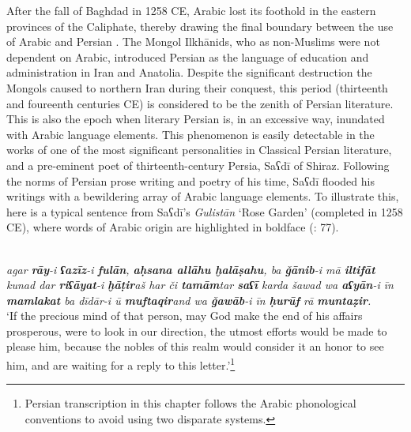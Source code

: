 \documentclass[output=paper]{langsci/langscibook}
\begin{document}
After the fall of Baghdad in 1258 CE, Arabic lost its foothold in the eastern provinces of the Caliphate, thereby drawing the final boundary between the use of Arabic and Persian \citep{Danner2000}. The Mongol Ilkhānids, who as non-Muslims were not dependent on Arabic, introduced Persian as the language of education and administration in Iran and Anatolia. Despite the significant destruction the Mongols caused to northern Iran during their conquest, this period (thirteenth and foureenth centuries CE) is considered to be the zenith of Persian literature. This is also the epoch when literary Persian is, in an excessive way, inundated with Arabic language elements. This phenomenon is easily detectable in the works of one of the most significant personalities in Classical Persian literature, and a pre-eminent poet of thirteenth-century Persia, Saʕdī of Shiraz. Following the norms of Persian prose writing and poetry of his time, Saʕdī flooded his writings with a bewildering array of Arabic language elements. To illustrate this, here is a typical sentence from Saʕdī’s \textit{Gulistān} ‘Rose Garden’ (completed in 1258 CE), where words of Arabic origin are highlighted in boldface (\citealt{Yūsifī2004}: 77).


\ea
{}\\
{\itshape agar \textbf{rāy}-i \textbf{ʕazīz}-i \textbf{fulān}, \textbf{aḥsana allāhu ḫalāṣahu}, ba \textbf{ǧānib}-i mā \textbf{iltifāt} kunad dar \textbf{riʕāyat}-i \textbf{ḫāṭir}aš har či \textbf{tamām}tar \textbf{saʕī}  karda  šawad wa \textbf{aʕyān}-i īn \textbf{mamlakat} ba dīdār-i ū \textbf{muftaqir}and wa \textbf{ǧawāb}-i īn \textbf{ḥurūf} rā \textbf{muntaẓir}.}\\
\glt ‘If the precious mind of that person, may God make the end of his affairs prosperous, were to look in our direction, the utmost efforts would be made to please him, because the nobles of this realm would consider it an honor to see him, and are waiting for a reply to this letter.’\footnote{Persian transcription in this chapter follows the Arabic phonological conventions to avoid using two disparate systems.}
\z
\end{document}
